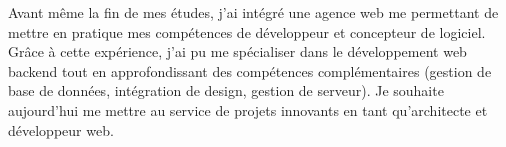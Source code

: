 \par{
Avant même la fin de mes études, j'ai intégré une agence web me permettant de mettre en pratique mes compétences de développeur et concepteur de logiciel. Grâce à cette expérience, j'ai pu me spécialiser dans le développement web backend tout en approfondissant des compétences complémentaires (gestion de base de données, intégration de design, gestion de serveur). Je souhaite aujourd'hui me mettre au service de projets innovants en tant qu'architecte et développeur web.
}

